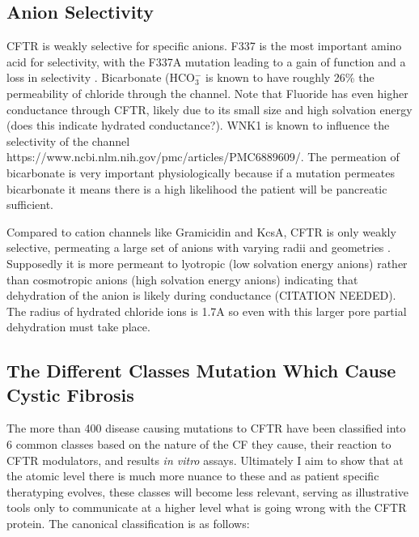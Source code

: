 \subsection {Anion Selectivity}
CFTR is weakly selective for specific anions. F337 is the most important amino acid for selectivity, with the F337A mutation leading to a gain of function and a loss in selectivity \cite{wei2016}. Bicarbonate (HCO$_3^-$ is known to have roughly 26\% the permeability of chloride through the channel. Note that Fluoride has even higher conductance through CFTR, likely due to its small size and high solvation energy (does this indicate hydrated conductance?). WNK1 is known to influence the selectivity of the channel https://www.ncbi.nlm.nih.gov/pmc/articles/PMC6889609/. The permeation of bicarbonate is very important physiologically because if a mutation permeates bicarbonate it means there is a high likelihood the patient will be pancreatic sufficient. 

Compared to cation channels like Gramicidin and KcsA, CFTR is only weakly selective, permeating a large set of anions with varying radii and geometries \cite{}. Supposedly it is more permeant to lyotropic (low solvation energy anions) rather than cosmotropic anions (high solvation energy anions) indicating that dehydration of the anion is likely during conductance (CITATION NEEDED). The radius of hydrated chloride ions is 1.7A \cite{yang2002} so even with this larger pore partial dehydration must take place. 


\subsection{The Different Classes Mutation Which Cause Cystic Fibrosis}
The more than 400 disease causing mutations to CFTR have been classified into 6 common classes based on the nature of the CF they cause, their reaction to CFTR modulators, and results \textit{in vitro} assays. Ultimately I aim to show that at the atomic level there is much more nuance to these and as patient specific theratyping evolves, these classes will become less relevant, serving as illustrative tools only to communicate at a higher level what is going wrong with the CFTR protein. The canonical classification is as follows:

